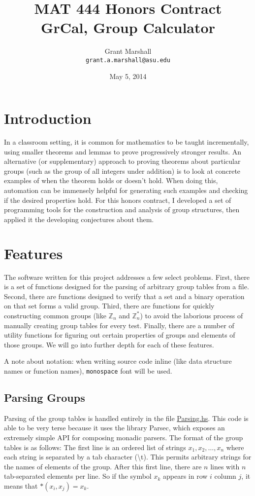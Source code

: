 \documentclass[11pt,a4paper]{article}
\title{MAT 444 Honors Contract\\GrCal, Group Calculator}
\author{Grant Marshall\\\texttt{grant.a.marshall@asu.edu}}
\date{May 5, 2014}
\theoremstyle{definition}
\begin{document}
\maketitle

\section{Introduction}

In a classroom setting, it is common for mathematics to be taught incrementally, using smaller theorems and lemmas to prove progressively stronger results. An alternative (or supplementary) approach to proving theorems about particular groups (such as the group of all integers under addition) is to look at concrete examples of when the theorem holds or doesn't hold. When doing this, automation can be immensely helpful for generating such examples and checking if the desired properties hold. For this honors contract, I developed a set of programming tools for the construction and analysis of group structures, then applied it the developing conjectures about them.

\section{Features}

The software written for this project addresses a few select problems. First, there is a set of functions designed for the parsing of arbitrary group tables from a file. Second, there are functions designed to verify that a set and a binary operation on that set forms a valid group. Third, there are functions for quickly constructing common groups (like $\mathbb{Z}_n$ and $\mathbb{Z}_n^\ast$) to avoid the laborious process of manually creating group tables for every test. Finally, there are a number of utility functions for figuring out certain properties of groups and elements of those groups. We will go into further depth for each of these features.

A note about notation: when writing source code inline (like data structure names or function names), \texttt{monospace} font will be used.

\subsection{Parsing Groups}

Parsing of the group tables is handled entirely in the file \href{https://github.com/gr-a-m/GrCal/blob/master/src/GrCal/Parsing.hs}{Parsing.hs}. This code is able to be very terse because it uses the library Parsec, which exposes an extremely simple API for composing monadic parsers. The format of the group tables is as follows: The first line is an ordered list of strings $x_1, x_2, \ldots, x_n$ where each string is separated by a tab character (\textbackslash t). This permits arbitrary strings for the names of elements of the group. After this first line, there are $n$ lines with $n$ tab-separated elements per line. So if the symbol $x_k$ appears in row $i$ column $j$, it means that $*(x_i, x_j) = x_k$.
\end{document}
